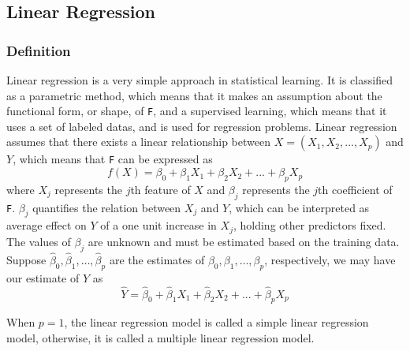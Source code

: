 \documentclass[conf]{new-aiaa}
\begin{document}
\subsection{Linear Regression}
\subsubsection{Definition}
Linear regression is a very simple approach in statistical learning. It is classified as a parametric method, which means that it makes an assumption about the functional form, or shape, of \texttt{F}, and a supervised learning, which means that it uses a set of labeled datas, and is used for regression problems. Linear regression assumes that there exists a linear relationship between $X = (X_1, X_2, \dots, X_p)$ and $Y$, which means that \texttt{F} can be expressed as
\begin{equation} \label{eq:linmod}
    f(X) = \beta_0 + \beta_1X_1 + \beta_2X_2 + ... + \beta_pX_p
\end{equation}
where $X_j$ represents the $j$th feature of $X$ and $\beta_j$ represents the $j$th coefficient of \texttt{F}. $\beta_j$ quantifies the relation between $X_j$ and $Y$, which can be interpreted as average effect on $Y$ of a one unit increase in $X_j$, holding other predictors fixed. The values of $\beta_j$ are unknown and must be estimated based on the training data. Suppose $\hat{\beta}_0, \hat{\beta}_1, \dots, \hat{\beta}_p$ are the estimates of $\beta_0, \beta_1, \dots, \beta_p$, respectively, we may have our estimate of $Y$ as
\begin{equation} \label{eq:linreg}
    \hat{Y} = \hat{\beta}_0 + \hat{\beta}_1X_1 + \hat{\beta}_2X_2 + ... + \hat{\beta}_pX_p
\end{equation}

When $p = 1$, the linear regression model is called a simple linear regression model, otherwise, it is called a multiple linear regression model.
\end{document}
